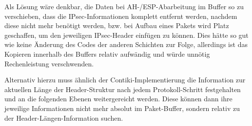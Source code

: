 Als Lösung wäre denkbar, die Daten bei AH-/ESP-Abarbeitung im Buffer so zu verschieben, dass die IPsec-Informationen komplett entfernt werden, nachdem diese nicht mehr benötigt werden, bzw. bei Aufbau eines Pakets wird Platz geschaffen, um den jeweiligen IPsec-Header einfügen zu können. Dies hätte so gut wie keine Änderung des Codes der anderen Schichten zur Folge, allerdings ist das Kopieren innerhalb des Buffers relativ auf\-wän\-dig und würde unnötig Rechenleistung verschwenden.

Alternativ hierzu muss ähnlich der Contiki-Implementierung die Information zur aktuellen Länge der Header-Struktur nach jedem Protokoll-Schritt festgehalten und an die folgenden Ebenen weitergereicht werden. Diese können dann ihre jeweilige Informationen nicht mehr absolut im Paket-Buffer, sondern relativ zu der Header-Längen-Information suchen.